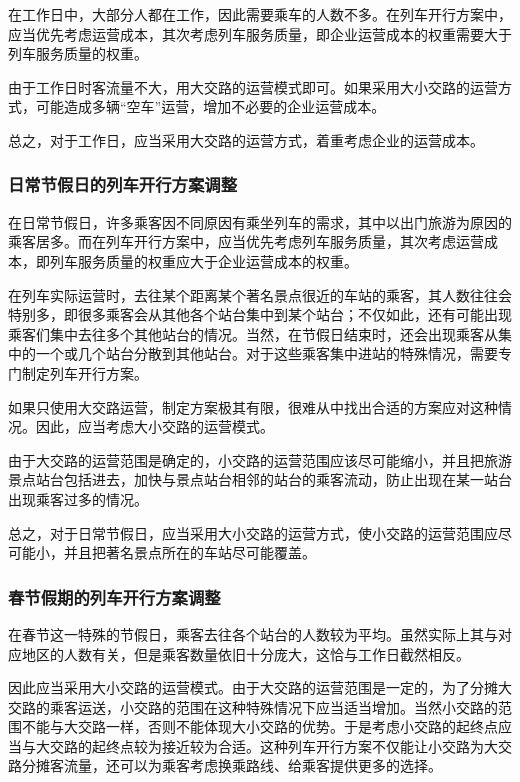 在工作日中，大部分人都在工作，因此需要乘车的人数不多。在列车开行方案中，应当优先考虑运营成本，其次考虑列车服务质量，即企业运营成本的权重需要大于列车服务质量的权重。

由于工作日时客流量不大，用大交路的运营模式即可。如果采用大小交路的运营方式，可能造成多辆“空车”运营，增加不必要的企业运营成本。

总之，对于工作日，应当采用大交路的运营方式，着重考虑企业的运营成本。

\subsubsection{日常节假日的列车开行方案调整}

在日常节假日，许多乘客因不同原因有乘坐列车的需求，其中以出门旅游为原因的乘客居多。而在列车开行方案中，应当优先考虑列车服务质量，其次考虑运营成本，即列车服务质量的权重应大于企业运营成本的权重。

在列车实际运营时，去往某个距离某个著名景点很近的车站的乘客，其人数往往会特别多，即很多乘客会从其他各个站台集中到某个站台；不仅如此，还有可能出现乘客们集中去往多个其他站台的情况。当然，在节假日结束时，还会出现乘客从集中的一个或几个站台分散到其他站台。对于这些乘客集中进站的特殊情况，需要专门制定列车开行方案。

如果只使用大交路运营，制定方案极其有限，很难从中找出合适的方案应对这种情况。因此，应当考虑大小交路的运营模式。

由于大交路的运营范围是确定的，小交路的运营范围应该尽可能缩小，并且把旅游景点站台包括进去，加快与景点站台相邻的站台的乘客流动，防止出现在某一站台出现乘客过多的情况。

总之，对于日常节假日，应当采用大小交路的运营方式，使小交路的运营范围应尽可能小，并且把著名景点所在的车站尽可能覆盖。

\subsubsection{春节假期的列车开行方案调整}

在春节这一特殊的节假日，乘客去往各个站台的人数较为平均。虽然实际上其与对应地区的人数有关，但是乘客数量依旧十分庞大，这恰与工作日截然相反。

因此应当采用大小交路的运营模式。由于大交路的运营范围是一定的，为了分摊大交路的乘客运送，小交路的范围在这种特殊情况下应当适当增加。当然小交路的范围不能与大交路一样，否则不能体现大小交路的优势。于是考虑小交路的起终点应当与大交路的起终点较为接近较为合适。这种列车开行方案不仅能让小交路为大交路分摊客流量，还可以为乘客考虑换乘路线、给乘客提供更多的选择。

